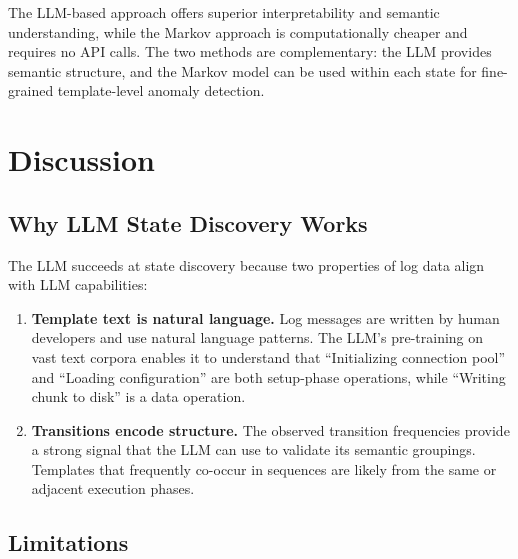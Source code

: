 \documentclass[11pt]{article}
\begin{document}
The LLM-based approach offers superior interpretability and semantic understanding, while the Markov approach is computationally cheaper and requires no API calls. The two methods are complementary: the LLM provides semantic structure, and the Markov model can be used within each state for fine-grained template-level anomaly detection.

\section{Discussion}
\label{sec:discussion}

\subsection{Why LLM State Discovery Works}

The LLM succeeds at state discovery because two properties of log data align with LLM capabilities:

\begin{enumerate}[leftmargin=*,itemsep=2pt]
    \item \textbf{Template text is natural language.} Log messages are written by human developers and use natural language patterns. The LLM's pre-training on vast text corpora enables it to understand that ``Initializing connection pool'' and ``Loading configuration'' are both setup-phase operations, while ``Writing chunk to disk'' is a data operation.
    
    \item \textbf{Transitions encode structure.} The observed transition frequencies provide a strong signal that the LLM can use to validate its semantic groupings. Templates that frequently co-occur in sequences are likely from the same or adjacent execution phases.
\end{enumerate}

\subsection{Limitations}
\end{document}
